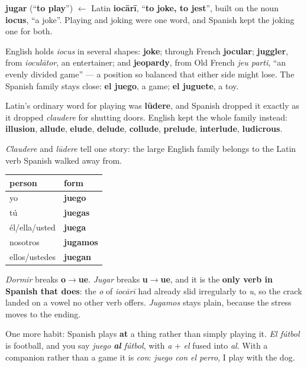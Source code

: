\begin{cousinweb}
\textbf{jugar} (\textquotedblleft{}\textbf{to play}\textquotedblright{}) $\leftarrow$ Latin \textbf{iocārī}, \textquotedblleft{}\textbf{to joke, to jest}\textquotedblright{}, built on the noun \textbf{iocus}, \textquotedblleft{}a joke\textquotedblright{}. Playing and joking were one word, and Spanish kept the joking one for both.

English holds \emph{iocus} in several shapes: \textbf{joke}; through French \textbf{jocular}; \textbf{juggler}, from \emph{ioculātor}, an entertainer; and \textbf{jeopardy}, from Old French \emph{jeu parti}, \textquotedblleft{}an evenly divided game\textquotedblright{} — a position so balanced that either side might lose. The Spanish family stays close: \textbf{el juego}, a game; \textbf{el juguete}, a toy.
\end{cousinweb}

\begin{culture}
Latin's ordinary word for playing was \textbf{lūdere}, and Spanish dropped it exactly as it dropped \emph{claudere} for shutting doors. English kept the whole family instead: \textbf{illusion}, \textbf{allude}, \textbf{elude}, \textbf{delude}, \textbf{collude}, \textbf{prelude}, \textbf{interlude}, \textbf{ludicrous}.

\emph{Claudere} and \emph{lūdere} tell one story: the large English family belongs to the Latin verb Spanish walked away from.
\end{culture}

\begin{grammarlens}[title={Grammar Lens: the fourth crack, with one member}]
\noindent
\begin{tabularx}{\linewidth}{@{}>{\raggedright\arraybackslash}X>{\raggedright\arraybackslash}X@{}}
\toprule
\textbf{person} & \textbf{form} \\
\midrule
yo & \textbf{juego} \\
tú & \textbf{juegas} \\
él/ella/usted & \textbf{juega} \\
nosotros & \textbf{jugamos} \\
ellos/ustedes & \textbf{juegan} \\
\bottomrule
\end{tabularx}

\emph{Dormir} breaks \textbf{o$\to$ue}. \emph{Jugar} breaks \textbf{u$\to$ue}, and it is the \textbf{only verb in Spanish that does}: the \emph{o} of \emph{iocārī} had already slid irregularly to \emph{u}, so the crack landed on a vowel no other verb offers. \emph{Jugamos} stays plain, because the stress moves to the ending.

One more habit: Spanish plays \textbf{at} a thing rather than simply playing it. \emph{El fútbol} is football, and you say \emph{juego \textbf{al} fútbol}, with \emph{a} + \emph{el} fused into \emph{al}. With a companion rather than a game it is \emph{con}: \emph{juego con el perro}, I play with the dog.
\end{grammarlens}

